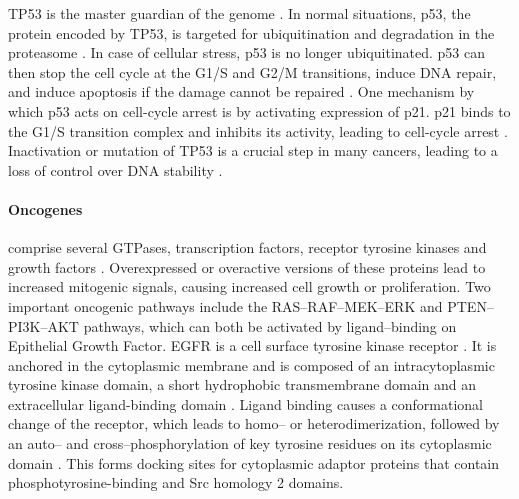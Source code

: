 {{{      TP53 is the master guardian of the genome {\cite{tp53_1}}. In normal situations, p53, the
      protein encoded by TP53, is targeted for ubiquitination and degradation in
      the proteasome {\cite{tp53_2}}. In case of cellular stress, p53 is no longer
      ubiquitinated. p53 can then stop the cell cycle at the G1/S and G2/M
      transitions, induce DNA repair, and induce apoptosis if the damage cannot
      be repaired {\cite{tp53_3}}. One mechanism by which p53 acts on cell-cycle arrest is by
      activating expression of p21. p21 binds to the G1/S transition complex and
      inhibits its activity, leading to cell-cycle arrest {\cite{tp53_3}}. Inactivation or
      mutation of TP53 is a crucial step in many cancers, leading to a loss of
      control over DNA stability {\cite{tp53_4}}.

      \paragraph{Oncogenes} comprise several GTPases, transcription factors,
      receptor tyrosine kinases and growth factors {\cite{oncogenes}}. Overexpressed or overactive
      versions of these proteins lead to increased mitogenic signals, causing
      increased cell growth or proliferation. Two important oncogenic pathways
      include the RAS--RAF--MEK--ERK and PTEN--PI3K--AKT pathways, which can
      both be activated by ligand--binding on Epithelial Growth Factor. EGFR is
      a cell surface tyrosine kinase receptor {\cite{egfr_review}}. It is anchored in the cytoplasmic
      membrane and is composed of an intracytoplasmic tyrosine kinase domain, a
      short hydrophobic transmembrane domain and an extracellular ligand-binding
      domain {\cite{egfr_review_2}}. Ligand binding causes a conformational change of the receptor,
      which leads to homo-- or heterodimerization, followed by an auto-- and
      cross--phosphorylation of key tyrosine residues on its cytoplasmic domain {\cite{egfr_review_2}}.
      This forms docking sites for cytoplasmic adaptor proteins that contain
      phosphotyrosine-binding and Src homology 2 domains.

}}}

